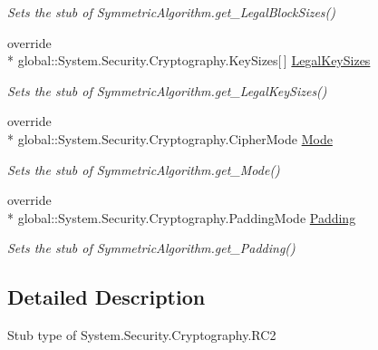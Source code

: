 \begin{DoxyCompactItemize}
\begin{DoxyCompactList}\small\item\em Sets the stub of Symmetric\-Algorithm.\-get\-\_\-\-Legal\-Block\-Sizes()\end{DoxyCompactList}\item 
override \\*
global\-::\-System.\-Security.\-Cryptography.\-Key\-Sizes\mbox{[}$\,$\mbox{]} \hyperlink{class_system_1_1_security_1_1_cryptography_1_1_fakes_1_1_stub_r_c2_a7d16fd55f26cd291620a7aa461669b7b}{Legal\-Key\-Sizes}
\begin{DoxyCompactList}\small\item\em Sets the stub of Symmetric\-Algorithm.\-get\-\_\-\-Legal\-Key\-Sizes()\end{DoxyCompactList}\item 
override \\*
global\-::\-System.\-Security.\-Cryptography.\-Cipher\-Mode \hyperlink{class_system_1_1_security_1_1_cryptography_1_1_fakes_1_1_stub_r_c2_abf2fc1832a62594aafefac68fec9a365}{Mode}
\begin{DoxyCompactList}\small\item\em Sets the stub of Symmetric\-Algorithm.\-get\-\_\-\-Mode()\end{DoxyCompactList}\item 
override \\*
global\-::\-System.\-Security.\-Cryptography.\-Padding\-Mode \hyperlink{class_system_1_1_security_1_1_cryptography_1_1_fakes_1_1_stub_r_c2_a8ecc1d77fcc4a386c523fce9637932a1}{Padding}
\begin{DoxyCompactList}\small\item\em Sets the stub of Symmetric\-Algorithm.\-get\-\_\-\-Padding()\end{DoxyCompactList}\end{DoxyCompactItemize}


\subsection{Detailed Description}
Stub type of System.\-Security.\-Cryptography.\-R\-C2



